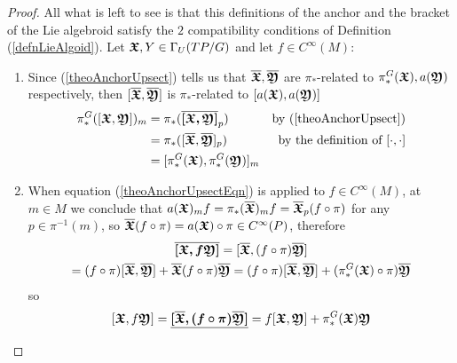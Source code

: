 \begin{proof}
All what is left to see is that this definitions of the anchor and the bracket of the Lie algebroid satisfy the $2$ compatibility conditions of Definition (\ref{defnLieAlgoid}). Let $\bm{\mathfrak{X}}, Y \in \Gamma_U(TP/G)$ and let $f \in C^{\infty}(M)$:

    \begin{enumerate}
    
    \item Since (\ref{theoAnchorUpsect}) tells us that $\overline{\bm{\bm{\mathfrak{X}}}}, \overline{\bm{\bm{\mathfrak{Y}}}}$ are $\pi_*$-related to $\pi_*^G(\bm{\mathfrak{X}}), a(\bm{\mathfrak{Y}})$ respectively, then $[\overline{\bm{\bm{\mathfrak{X}}}}, \overline{\bm{\bm{\mathfrak{Y}}}}]$ is $\pi_*$-related to $[a(\bm{\mathfrak{X}}), a(\bm{\mathfrak{Y}})]$
    \begin{align*}
        \pi_*^G([\bm{\mathfrak{X}}, \bm{\mathfrak{Y}}])_m &= \pi_*(\overline{\bm{[\bm{\mathfrak{X}}, \bm{\mathfrak{Y}}]}}_p) & \textrm{by (\ref{theoAnchorUpsect})} \\
                                    &= \pi_*([\overline{\bm{\bm{\mathfrak{X}}}}, \overline{\bm{ \bm{\mathfrak{Y}}}}]_p) & \textrm{by the definition of $[\cdot, \cdot]$} \\
                                    &= [\pi_*^G(\bm{\mathfrak{X}}), \pi_*^G(\bm{\mathfrak{Y}})]_m 
    \end{align*}
    
    \item When equation (\ref{theoAnchorUpsectEqn}) is applied to $f \in C^\infty(M)$, at $m\in M$ we conclude that $a(\bm{\mathfrak{X}})_mf = \pi_*(\overline{\bm{\bm{\mathfrak{X}}}})_m f = \overline{\bm{\bm{\mathfrak{X}}}}_p(f \circ \pi)$ for any $p \in \pi^{-1}(m)$, so $\overline{\bm{\bm{\mathfrak{X}}}}(f \circ \pi) = a(\bm{\mathfrak{X}}) \circ \pi \in C^\infty(P)$, therefore
    \begin{multline*}
        \overline{\bm{[\bm{\mathfrak{X}}, f \bm{\mathfrak{Y}}]}} 
        =[\overline{\bm{\bm{\mathfrak{X}}}}, (f \circ \pi) \overline{\bm{\bm{\mathfrak{Y}}}}] \\
        = (f \circ \pi)[\overline{\bm{\bm{\mathfrak{X}}}}, \overline{\bm{\bm{\mathfrak{Y}}}}] + \overline{\bm{\bm{\mathfrak{X}}}}(f \circ \pi) \overline{\bm{\bm{\mathfrak{Y}}}} = 
        (f \circ \pi)[\overline{\bm{\bm{\mathfrak{X}}}}, \overline{\bm{\bm{\mathfrak{Y}}}}] + (\pi_*^G(\bm{\mathfrak{X}}) \circ \pi) \overline{\bm{\bm{\mathfrak{Y}}}}
    \end{multline*} so 
    \[
        [\bm{\mathfrak{X}}, f \bm{\mathfrak{Y}}] = \underline{\bm{[\overline{\bm{\bm{\mathfrak{X}}}}, (f \circ \pi) \overline{\bm{\bm{\mathfrak{Y}}}}]}} = f[\bm{\mathfrak{X}}, \bm{\mathfrak{Y}}] + \pi_*^G(\bm{\mathfrak{X}}) \bm{\mathfrak{Y}}
    \]
    
    \end{enumerate}

\end{proof}

